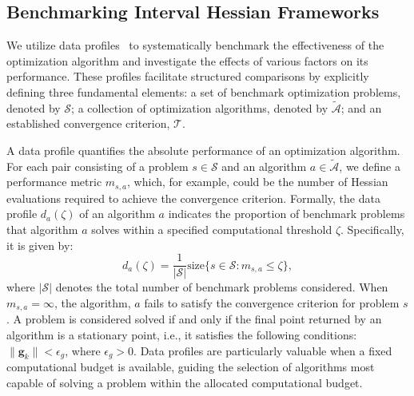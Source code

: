 \documentclass{elsarticle}
\numberwithin{equation}{section}
\begin{document}
\subsection{Benchmarking Interval Hessian Frameworks}
We utilize data profiles~\cite{doi:10.1137/080724083} to systematically benchmark the effectiveness of the optimization algorithm and investigate the effects of various factors on its performance. These profiles facilitate structured comparisons by explicitly defining three fundamental elements: a set of benchmark optimization problems, denoted by $\mathcal{S}$; a collection of optimization algorithms, denoted by $\mathcal{\tilde{A}}$; and an established convergence criterion, $\mathcal{T}$.

A data profile quantifies the absolute performance of an optimization algorithm. For each pair consisting of a problem $s \in \mathcal{S}$ and an algorithm $a \in \mathcal{\tilde{A}}$, we define a performance metric $m_{s,a}$, which, for example, could be the number of Hessian evaluations required to achieve the convergence criterion. Formally, the data profile $d_a(\zeta)$ of an algorithm $a$ indicates the proportion of benchmark problems that algorithm $a$ solves within a specified computational threshold $\zeta$. Specifically, it is given by:
\begin{equation}
    d_a(\zeta) = \frac{1}{|\mathcal{S}|}\text{size}\{s\in\mathcal{S}:m_{s,a}\leq \zeta\},
    \label{eq:dataprofile}
\end{equation}
where $|\mathcal{S}|$ denotes the total number of benchmark problems considered. When $m_{s,a} = \infty$, the algorithm, $a$ fails to satisfy the convergence criterion for problem $s$. A problem is considered solved if and only if the final point returned by an algorithm is a stationary point, i.e., it satisfies the following conditions: $\|\mathbf{g}_k\| < \epsilon_g$, where $\epsilon_g>0$. Data profiles are particularly valuable when a fixed computational budget is available, guiding the selection of algorithms most capable of solving a problem within the allocated computational budget.
\end{document}
